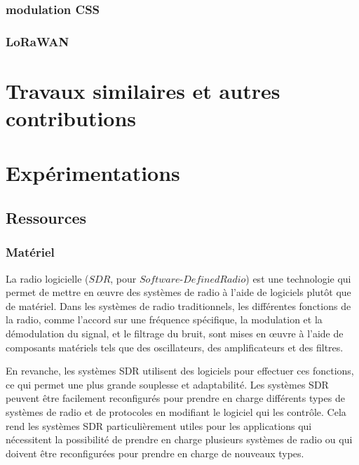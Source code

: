 \documentclass[12pt,a4paper,oneside, titlepage]{report}
\begin{document}
\subsection{modulation CSS}






\subsection{LoRaWAN}




\newpage

\chapter{Travaux similaires et autres contributions}


\newpage

\chapter{Expérimentations}

\section{Ressources}

\subsection{Matériel}

La radio logicielle ($SDR$, pour $Software$-$Defined Radio$) est une technologie qui permet de mettre en œuvre des systèmes de radio à l'aide de logiciels plutôt que de matériel. Dans les systèmes de radio traditionnels, les différentes fonctions de la radio, comme l'accord sur une fréquence spécifique, la modulation et la démodulation du signal, et le filtrage du bruit, sont mises en œuvre à l'aide de composants matériels tels que des oscillateurs, des amplificateurs et des filtres.

En revanche, les systèmes SDR utilisent des logiciels pour effectuer ces fonctions, ce qui permet une plus grande souplesse et adaptabilité. Les systèmes SDR peuvent être facilement reconfigurés pour prendre en charge différents types de systèmes de radio et de protocoles en modifiant le logiciel qui les contrôle. Cela rend les systèmes SDR particulièrement utiles pour les applications qui nécessitent la possibilité de prendre en charge plusieurs systèmes de radio ou qui doivent être reconfigurées pour prendre en charge de nouveaux types.
\end{document}
